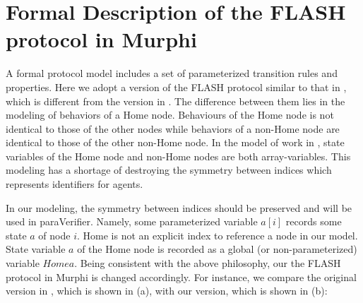 \documentclass{llncs}
\begin{document}





\section{Formal Description of the FLASH protocol in Murphi\label{sec:formalDescription}}
A formal protocol model includes a set of parameterized transition rules and properties.  Here we adopt a version of the FLASH protocol similar to that in \cite{cubeicBeyond}, which is different from the version in \cite{Chou2004}. The difference between them lies in the modeling of behaviors of a Home node. Behaviours of the Home node is not identical to those of the other nodes while behaviors of
 a non-Home node are identical to those of the other non-Home node. In the model of work in \cite{Chou2004}, state variables of the Home node and non-Home nodes are both array-variables. This modeling has a shortage of destroying the symmetry between indices which represents identifiers for agents.

In our modeling, the symmetry between indices should be preserved and will be used in {\sf paraVerifier}. Namely,  %
some parameterized variable $a[i]$ records some state  $a$ of node $i$. Home is not an explicit index to reference a node in our model. State variable
  $a$ of the Home node  is recorded as a global  (or non-parameterized) variable $Homea$. %
 Being consistent with the above philosophy, our the FLASH protocol in Murphi is changed accordingly. For instance, we compare the original version in \cite{Chou2004}, which is shown in (a), with our version, which is shown in (b):
\end{document}
